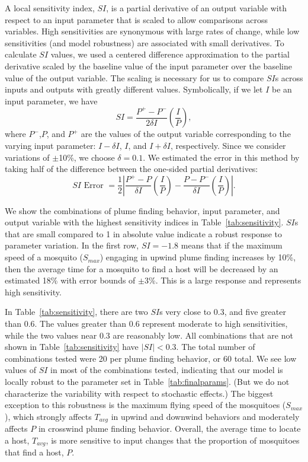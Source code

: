 \documentclass[10pt]{article}
\begin{document}
A local sensitivity index, $SI$, is a partial derivative of an output variable with respect to an input parameter that is scaled to allow comparisons across variables. High sensitivities are synonymous with large rates of change, while low sensitivities (and model robustness) are associated with small derivatives. To calculate $SI$ values, we used a centered difference approximation to the partial derivative scaled by the baseline value of the input parameter over the baseline value of the output variable. The scaling is necessary for us to compare $SI$s across inputs and outputs with greatly different values. Symbolically, if we let $I$ be an input parameter, we have
\begin{equation*}
	SI = \frac{P^+ - P^-}{2\delta I}\left(\frac{I}{P}\right),
\end{equation*}
where $P^-$,$P$, and $P^+$ are the values of the output variable corresponding to the varying input parameter: $I - \delta I$, $I$, and $I + \delta I$, respectively. Since we consider variations of $\pm$10\%, we choose $\delta = 0.1$.
We estimated the error in this method by taking half of the difference between the one-sided partial derivatives:
\begin{equation*}
	SI \text{ Error } = \frac{1}{2}\left|\frac{P^+ - P}{\delta I}\left(\frac{I}{P}\right) - \frac{P - P^-}{\delta I}\left(\frac{I}{P}\right) \right|.
\end{equation*}

We show the combinations of plume finding behavior, input parameter, and output variable with the highest sensitivity indices in Table~\ref{tab:sensitivity}. $SI$s that are small compared to 1 in absolute value indicate a robust response to parameter variation. In the first row, $SI = -1.8$ means that if the maximum speed of a mosquito ($S_{max}$) engaging in upwind plume finding increases by 10\%, then the average time for a mosquito to find a host will be decreased by an estimated 18\% with error bounds of $\pm$3\%.  This is a large response and represents high sensitivity. 

In Table~\ref{tab:sensitivity}, there are two $SI$s very close to 0.3, and five greater than 0.6. The values greater than 0.6 represent moderate to high sensitivities, while the two values near 0.3 are reasonably low. All combinations that are not shown in Table~\ref{tab:sensitivity} have $|SI| < 0.3$. The total number of combinations tested were 20 per plume finding behavior, or 60 total. We see low values of $SI$ in most of the combinations tested, indicating that our model is locally robust to the parameter set in Table~\ref{tab:finalparams}. (But we do not characterize the variability with respect to stochastic effects.) The biggest exception to this robustness is the maximum flying speed of the mosquitoes ($S_{max}$), which strongly affects $T_{avg}$ in upwind and downwind behaviors and moderately affects $P$ in crosswind plume finding behavior. Overall, the average time to locate a host, $T_{avg}$, is more sensitive to input changes that the proportion of mosquitoes that find a host, $P$. 
\end{document}
